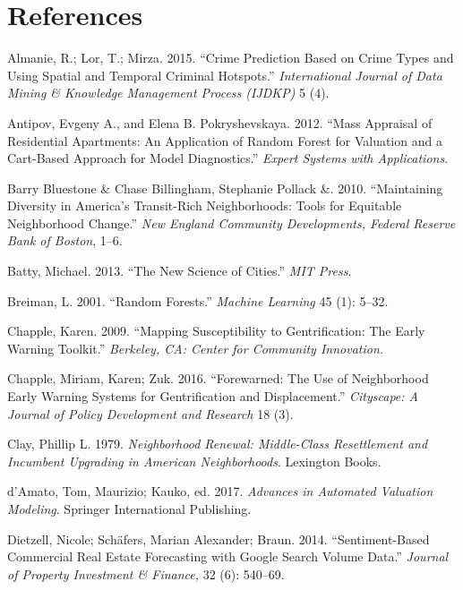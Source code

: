 \documentclass[12pt,]{article}
\begin{document}
\hypertarget{references}{%
\section*{References}\label{references}}

\hypertarget{refs}{}
\leavevmode\hypertarget{ref-Almanie2015}{}%
Almanie, R.; Lor, T.; Mirza. 2015. ``Crime Prediction Based on Crime
Types and Using Spatial and Temporal Criminal Hotspots.''
\emph{International Journal of Data Mining \& Knowledge Management
Process (IJDKP)} 5 (4).

\leavevmode\hypertarget{ref-antipov12}{}%
Antipov, Evgeny A., and Elena B. Pokryshevskaya. 2012. ``Mass Appraisal
of Residential Apartments: An Application of Random Forest for Valuation
and a Cart-Based Approach for Model Diagnostics.'' \emph{Expert Systems
with Applications}.

\leavevmode\hypertarget{ref-Pollack2010}{}%
Barry Bluestone \& Chase Billingham, Stephanie Pollack \&. 2010.
``Maintaining Diversity in America's Transit-Rich Neighborhoods: Tools
for Equitable Neighborhood Change.'' \emph{New England Community
Developments, Federal Reserve Bank of Boston}, 1--6.

\leavevmode\hypertarget{ref-Batty2013}{}%
Batty, Michael. 2013. ``The New Science of Cities.'' \emph{MIT Press}.

\leavevmode\hypertarget{ref-Breiman2001}{}%
Breiman, L. 2001. ``Random Forests.'' \emph{Machine Learning} 45 (1):
5--32.

\leavevmode\hypertarget{ref-Chapple2009}{}%
Chapple, Karen. 2009. ``Mapping Susceptibility to Gentrification: The
Early Warning Toolkit.'' \emph{Berkeley, CA: Center for Community
Innovation.}

\leavevmode\hypertarget{ref-Chapple2016}{}%
Chapple, Miriam, Karen; Zuk. 2016. ``Forewarned: The Use of Neighborhood
Early Warning Systems for Gentrification and Displacement.''
\emph{Cityscape: A Journal of Policy Development and Research} 18 (3).

\leavevmode\hypertarget{ref-Clay1979}{}%
Clay, Phillip L. 1979. \emph{Neighborhood Renewal: Middle-Class
Resettlement and Incumbent Upgrading in American Neighborhoods}.
Lexington Books.

\leavevmode\hypertarget{ref-Springer2017}{}%
d'Amato, Tom, Maurizio; Kauko, ed. 2017. \emph{Advances in Automated
Valuation Modeling}. Springer International Publishing.

\leavevmode\hypertarget{ref-Dietzell2014}{}%
Dietzell, Nicole; Schäfers, Marian Alexander; Braun. 2014.
``Sentiment-Based Commercial Real Estate Forecasting with Google Search
Volume Data.'' \emph{Journal of Property Investment \& Finance,} 32 (6):
540--69.
\end{document}
